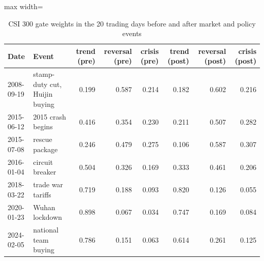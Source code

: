 \begin{table}[!htbp]\centering\scriptsize
\caption{CSI 300 gate weights in the 20 trading days before and after market and policy events}\label{tab:events}
\begin{adjustbox}{max width=\textwidth}
\begin{tabular}{llrrrrrr}
\toprule
Date & Event & trend (pre) & reversal (pre) & crisis (pre) & trend (post) & reversal (post) & crisis (post)\\
\midrule
2008-09-19 & stamp-duty cut, Huijin buying & 0.199 & 0.587 & 0.214 & 0.182 & 0.602 & 0.216\\
2015-06-12 & 2015 crash begins & 0.416 & 0.354 & 0.230 & 0.211 & 0.507 & 0.282\\
2015-07-08 & rescue package & 0.246 & 0.479 & 0.275 & 0.106 & 0.587 & 0.307\\
2016-01-04 & circuit breaker & 0.504 & 0.326 & 0.169 & 0.333 & 0.461 & 0.206\\
2018-03-22 & trade war tariffs & 0.719 & 0.188 & 0.093 & 0.820 & 0.126 & 0.055\\
2020-01-23 & Wuhan lockdown & 0.898 & 0.067 & 0.034 & 0.747 & 0.169 & 0.084\\
2024-02-05 & national team buying & 0.786 & 0.151 & 0.063 & 0.614 & 0.261 & 0.125\\
\bottomrule
\end{tabular}
\end{adjustbox}
\end{table}